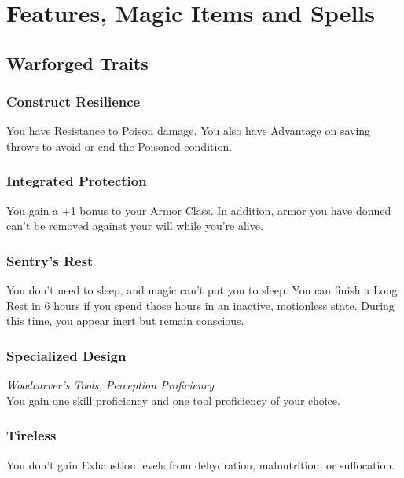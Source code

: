 \documentclass[letterpaper,openany,oneside,twocolumn]{book}
\begin{document}
\onecolumn


\rendercharactersheet

\renderbackgroundsheet

\renderspellsheet



\restoregeometry
\twocolumn

\chapter*{Features, Magic Items and Spells}

\section*{Warforged Traits}
\subsection*{Construct Resilience}
You have Resistance to Poison damage. You also have Advantage on saving throws to avoid or end the Poisoned condition.
\subsection*{Integrated Protection}
You gain a +1 bonus to your Armor Class. In addition, armor you have donned can't be removed against your will while you're alive.
\subsection*{Sentry's Rest}
You don't need to sleep, and magic can't put you to sleep. You can finish a Long Rest in 6 hours if you spend those hours in an inactive, motionless state. During this time, you appear inert but remain conscious.
\subsection*{Specialized Design}
\textit{Woodcarver's Tools, Perception Proficiency}\\
You gain one skill proficiency and one tool proficiency of your choice.
\subsection*{Tireless}
You don't gain Exhaustion levels from dehydration, malnutrition, or suffocation.
\end{document}
